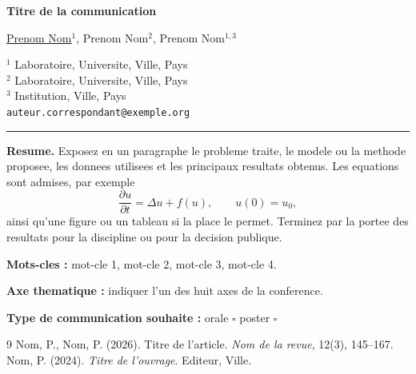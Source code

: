 \documentclass[11pt,a4paper]{article}
\begin{document}
\begin{center}
  {\Large\bfseries Titre de la communication\par}
  \vspace{4mm}

  \underline{Prenom Nom}$^{1}$, Prenom Nom$^{2}$, Prenom Nom$^{1,3}$
  \vspace{2mm}

  {\small
   $^{1}$ Laboratoire, Universite, Ville, Pays\\
   $^{2}$ Laboratoire, Universite, Ville, Pays\\
   $^{3}$ Institution, Ville, Pays\\
   \texttt{auteur.correspondant@exemple.org}
  }
\end{center}
\vspace{2mm}
\hrule
\vspace{4mm}

\noindent\textbf{Resume.}
Exposez en un paragraphe le probleme traite, le modele ou la methode
proposee, les donnees utilisees et les principaux resultats obtenus.
Les equations sont admises, par exemple
\begin{equation*}
  \frac{\partial u}{\partial t} = \Delta u + f(u), \qquad u(0)=u_{0},
\end{equation*}
ainsi qu'une figure ou un tableau si la place le permet.
Terminez par la portee des resultats pour la discipline ou pour
la decision publique.

\vspace{3mm}
\noindent\textbf{Mots-cles :} mot-cle 1, mot-cle 2, mot-cle 3, mot-cle 4.

\vspace{3mm}
\noindent\textbf{Axe thematique :} indiquer l'un des huit axes de la conference.

\vspace{1mm}
\noindent\textbf{Type de communication souhaite :} orale $\square$ \quad poster $\square$

\vspace{4mm}
\begin{thebibliography}{9}\footnotesize
{} Nom, P., Nom, P. (2026).
  Titre de l'article. \emph{Nom de la revue}, 12(3), 145--167.
 Nom, P. (2024).
  \emph{Titre de l'ouvrage}. Editeur, Ville.
\end{thebibliography}
\end{document}
